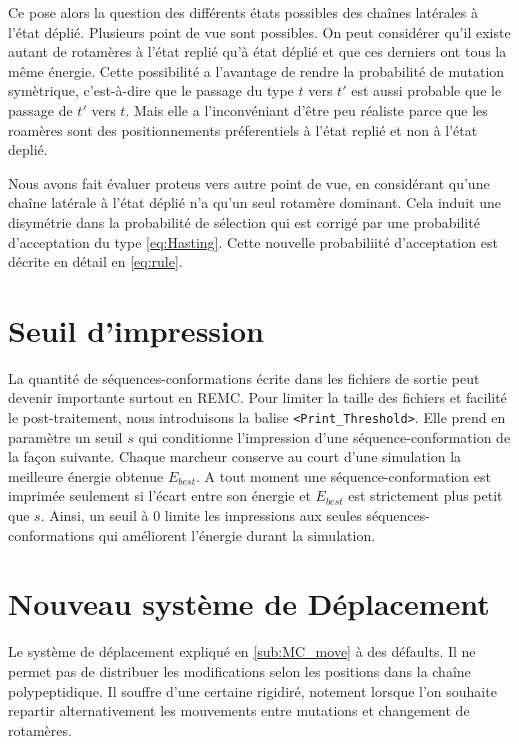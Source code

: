    Ce pose alors la question des différents états possibles des chaînes latérales à l'état déplié. Plusieurs point de vue sont possibles. On peut considérer qu'il existe autant de rotamères à l'état replié qu'à état déplié et que ces derniers ont tous la même énergie. Cette possibilité a l'avantage de rendre la probabilité de mutation symètrique, c'est-à-dire que le passage du type $t$ vers $t'$ est aussi probable que le passage de $t'$ vers $t$. Mais elle a l'inconvéniant d'être peu réaliste parce que les roamères sont des positionnements préferentiels à l'état replié et non à l'état deplié.

   Nous avons fait évaluer proteus vers autre point de vue, en considérant qu'une chaîne latérale à l'état déplié n'a qu'un seul rotamère dominant. Cela induit une disymétrie dans la probabilité de sélection qui est corrigé par une probabilité d'acceptation du type \ref{eq:Hasting}. Cette nouvelle probabiliité d'acceptation est décrite en détail en \ref{eq:rule}.

   \section{Seuil d'impression}
\label{sec:dev}
La quantité de séquences-conformations écrite dans les fichiers de sortie peut devenir importante surtout en REMC. Pour limiter la taille des fichiers et facilité le post-traitement, nous introduisons la balise    \verb!<Print_Threshold>!. Elle prend en paramètre un seuil $s$ qui conditionne l'impression d'une séquence-conformation de la façon suivante. Chaque marcheur conserve au court d'une simulation la meilleure énergie obtenue $E_{best}$. A tout moment une séquence-conformation est imprimée seulement si l'écart entre son énergie et $E_{best}$  est strictement plus petit que $s$. Ainsi, un seuil à $0$ limite les impressions aux seules séquences-conformations qui améliorent l'énergie durant la simulation.

\section{Nouveau système de Déplacement}

Le système de déplacement expliqué en \ref{sub:MC_move}  à des défaults. Il ne permet pas de distribuer les modifications selon les positions dans la chaîne polypeptidique. Il souffre d'une certaine rigidiré, notement lorsque l'on souhaite repartir alternativement les mouvements entre mutations et changement de rotamères.

